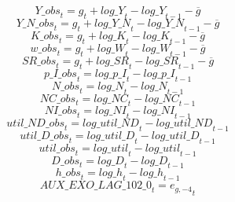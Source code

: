 \begin{dmath}
{Y\_obs}_{t}={{g}}_{t}+{log\_Y}_{t}-{log\_Y}_{t-1}-{{\overline{g}}}
\end{dmath}
\begin{dmath}
{Y\_N\_obs}_{t}={{g}}_{t}+{log\_Y\_N}_{t}-{log\_Y\_N}_{t-1}-{{\overline{g}}}
\end{dmath}
\begin{dmath}
{K\_obs}_{t}={{g}}_{t}+{log\_K}_{t}-{log\_K}_{t-1}-{{\overline{g}}}
\end{dmath}
\begin{dmath}
{w\_obs}_{t}={{g}}_{t}+{log\_W}_{t}-{log\_W}_{t-1}-{{\overline{g}}}
\end{dmath}
\begin{dmath}
{SR\_obs}_{t}={{g}}_{t}+{log\_SR}_{t}-{log\_SR}_{t-1}-{{\overline{g}}}
\end{dmath}
\begin{dmath}
{p\_I\_obs}_{t}={log\_p\_I}_{t}-{log\_p\_I}_{t-1}
\end{dmath}
\begin{dmath}
{N\_obs}_{t}={log\_N}_{t}-{log\_N}_{t-1}
\end{dmath}
\begin{dmath}
{NC\_obs}_{t}={log\_NC}_{t}-{log\_NC}_{t-1}
\end{dmath}
\begin{dmath}
{NI\_obs}_{t}={log\_NI}_{t}-{log\_NI}_{t-1}
\end{dmath}
\begin{dmath}
{util\_ND\_obs}_{t}={log\_util\_ND}_{t}-{log\_util\_ND}_{t-1}
\end{dmath}
\begin{dmath}
{util\_D\_obs}_{t}={log\_util\_D}_{t}-{log\_util\_D}_{t-1}
\end{dmath}
\begin{dmath}
{util\_obs}_{t}={log\_util}_{t}-{log\_util}_{t-1}
\end{dmath}
\begin{dmath}
{D\_obs}_{t}={log\_D}_{t}-{log\_D}_{t-1}
\end{dmath}
\begin{dmath}
{h\_obs}_{t}={log\_h}_{t}-{log\_h}_{t-1}
\end{dmath}
\begin{dmath}
{AUX\_EXO\_LAG\_102\_0}_{t}={{e_{g,-4}}}_{t}
\end{dmath}
